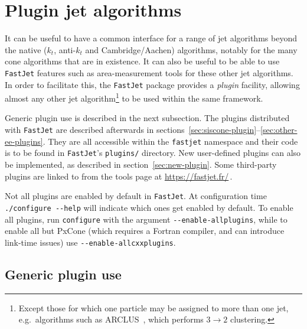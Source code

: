 \documentclass[12pt,a4]{article}
\newcommand{\fastjet}{\texttt{FastJet}\xspace}
\newcommand{\ttt}[1]{{\small\texttt{#1}}}
\begin{document}
\section{Plugin jet algorithms}
\label{sec:plugins}

It can be useful to have a common interface for a range of jet
algorithms beyond the native ($k_t$, anti-$k_t$ and Cambridge/Aachen)
algorithms, notably for the many cone algorithms that are in
existence. 
%
It can also be useful to be able to use \fastjet features such as
area-measurement tools for these other jet algorithms.
%
In order to facilitate this, the
\fastjet package provides a \emph{plugin} facility, allowing almost
any other jet algorithm\footnote{Except those for which one particle
  may be assigned to more than one jet, e.g.\ algorithms such as
  ARCLUS~\cite{Lonnblad:1992qd}, which performs $3\to2$
  clustering.} to be used within the same framework.

Generic plugin use is described in the next subsection.
%
The plugins distributed with \fastjet are described afterwards in
sections~\ref{sec:siscone-plugin}--\ref{sec:other-ee-plugins}.
%
They are all accessible within the \ttt{fastjet} namespace and their code
is to be found in \fastjet's \ttt{plugins/} directory.
%
New user-defined plugins can also be implemented, as described 
in section~\ref{sec:new-plugin}. 
%
Some third-party plugins are linked to from the tools page at
\url{https://fastjet.fr/}$\,$.

Not all plugins are enabled by default in \fastjet. At configuration
time \verb:./configure --help: will indicate which ones get enabled
by default. To enable all plugins, run \verb|configure| with the
argument \verb|--enable-allplugins|, while to enable all but PxCone
(which requires a Fortran compiler, and can introduce link-time issues) use
\verb|--enable-allcxxplugins|.


\subsection{Generic plugin use}
\label{sec:generic-plugin-use}
\end{document}
